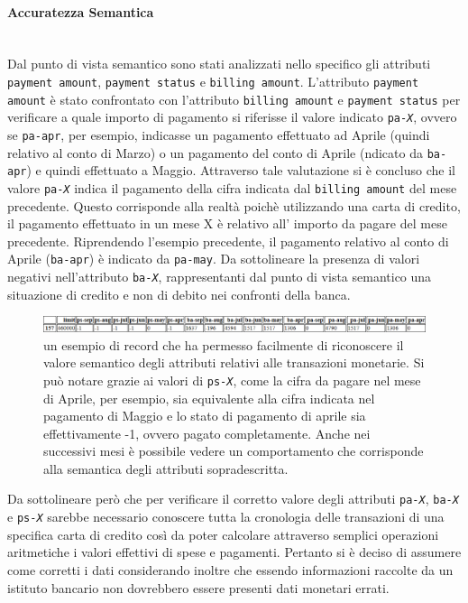\paragraph{Accuratezza Semantica}\mbox{}\\
Dal punto di vista semantico sono stati analizzati nello 
specifico gli attributi \texttt{payment amount},
\texttt{payment status} e \texttt{billing amount}.
L'attributo \texttt{payment amount} \`e stato confrontato
con l'attributo \texttt{billing amount} e \texttt{payment status}
per verificare a quale importo di pagamento si riferisse
il valore indicato \texttt{pa-\textit{X}}, ovvero
se \texttt{pa-apr}, per esempio, indicasse un pagamento
effettuato ad Aprile (quindi relativo al conto di Marzo) o
un pagamento del conto di Aprile (ndicato da \texttt{ba-apr})
e quindi effettuato a Maggio. Attraverso tale valutazione si
\`e concluso che il valore  \texttt{pa-\textit{X}} indica il
pagamento della cifra indicata dal \texttt{billing amount}
del mese precedente. Questo corrisponde alla realt\`a poich\`e
utilizzando una carta di credito, il pagamento effettuato in un
mese X \`e relativo all' importo da pagare del mese precedente.
Riprendendo l'esempio precedente, il pagamento relativo al conto
di Aprile (\texttt{ba-apr}) \`e indicato da \texttt{pa-may}. 
Da sottolineare la presenza di valori negativi nell'attributo
\texttt{ba-\textit{X}}, rappresentanti dal punto di vista semantico
una situazione di credito e non di debito nei confronti della banca.

\begin{figure}[H]
	\centering
	\includegraphics[width=\linewidth]{img/record-example.png}
	\caption[LOF entry]{
		un esempio di record che ha permesso
		facilmente di riconoscere il valore semantico degli attributi
		relativi alle transazioni monetarie. Si pu\`o notare grazie ai
		valori di \texttt{ps-\textit{X}}, come la cifra da pagare nel
		mese di Aprile, per esempio, sia equivalente alla cifra
		indicata nel pagamento di Maggio e lo stato di pagamento di
		aprile sia effettivamente -1, ovvero pagato completamente.
		Anche nei successivi mesi \`e possibile vedere un comportamento
		che corrisponde alla semantica degli attributi sopradescritta.
	}
	\label{record}
\end{figure}

Da sottolineare per\`o che per verificare il corretto
valore degli attributi  \texttt{pa-\textit{X}},
\texttt{ba-\textit{X}} e \texttt{ps-\textit{X}} sarebbe
necessario conoscere tutta la cronologia delle transazioni
di una specifica carta di credito cos\`i da poter calcolare
attraverso semplici operazioni aritmetiche i valori effettivi
di spese e pagamenti. Pertanto si \`e deciso di assumere come
corretti i dati considerando inoltre che essendo informazioni
raccolte da un istituto bancario non dovrebbero essere presenti
dati monetari errati. 

